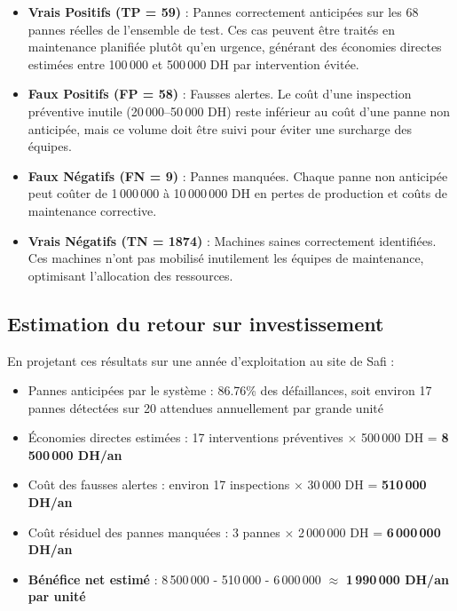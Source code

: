 \documentclass[a4paper,12pt]{report}
\begin{document}
\begin{itemize}
    \item \textbf{Vrais Positifs (TP = 59)} : Pannes correctement anticipées sur les 68 pannes réelles de l'ensemble de test. Ces cas peuvent être traités en maintenance planifiée plutôt qu'en urgence, générant des économies directes estimées entre 100\,000 et 500\,000 DH par intervention évitée.
    
    \item \textbf{Faux Positifs (FP = 58)} : Fausses alertes. Le coût d'une inspection préventive inutile (20\,000--50\,000 DH) reste inférieur au coût d'une panne non anticipée, mais ce volume doit être suivi pour éviter une surcharge des équipes.
    
    \item \textbf{Faux Négatifs (FN = 9)} : Pannes manquées. Chaque panne non anticipée peut coûter de 1\,000\,000 à 10\,000\,000 DH en pertes de production et coûts de maintenance corrective.
    
    \item \textbf{Vrais Négatifs (TN = 1874)} : Machines saines correctement identifiées. Ces machines n'ont pas mobilisé inutilement les équipes de maintenance, optimisant l'allocation des ressources.
\end{itemize}

\subsection{Estimation du retour sur investissement}

En projetant ces résultats sur une année d'exploitation au site de Safi :

\begin{itemize}
    \item Pannes anticipées par le système : 86.76\% des défaillances, soit environ 17 pannes détectées sur 20 attendues annuellement par grande unité
    \item Économies directes estimées : 17 interventions préventives $\times$ 500\,000 DH = \textbf{8\,500\,000 DH/an}
    \item Coût des fausses alertes : environ 17 inspections $\times$ 30\,000 DH = \textbf{510\,000 DH/an}
    \item Coût résiduel des pannes manquées : 3 pannes $\times$ 2\,000\,000 DH = \textbf{6\,000\,000 DH/an}
    \item \textbf{Bénéfice net estimé} : 8\,500\,000 - 510\,000 - 6\,000\,000 $\approx$ \textbf{1\,990\,000 DH/an par unité}
\end{itemize}
\end{document}

